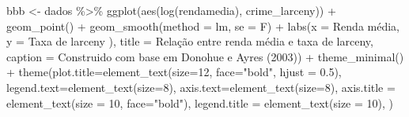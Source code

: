 \documentclass[
]{article}
\newenvironment{Shaded}{\begin{snugshade}}{\end{snugshade}}
\newcommand{\AttributeTok}[1]{\textcolor[rgb]{0.77,0.63,0.00}{#1}}
\newcommand{\DecValTok}[1]{\textcolor[rgb]{0.00,0.00,0.81}{#1}}
\newcommand{\FloatTok}[1]{\textcolor[rgb]{0.00,0.00,0.81}{#1}}
\newcommand{\FunctionTok}[1]{\textcolor[rgb]{0.00,0.00,0.00}{#1}}
\newcommand{\NormalTok}[1]{#1}
\newcommand{\OtherTok}[1]{\textcolor[rgb]{0.56,0.35,0.01}{#1}}
\newcommand{\SpecialCharTok}[1]{\textcolor[rgb]{0.00,0.00,0.00}{#1}}
\newcommand{\StringTok}[1]{\textcolor[rgb]{0.31,0.60,0.02}{#1}}
\begin{document}
\begin{Shaded}
\begin{Highlighting}[]
\NormalTok{bbb }\OtherTok{\textless{}{-}}\NormalTok{ dados }\SpecialCharTok{\%\textgreater{}\%} 
  \FunctionTok{ggplot}\NormalTok{(}\FunctionTok{aes}\NormalTok{(}\FunctionTok{log}\NormalTok{(rendamedia), crime\_larceny)) }\SpecialCharTok{+}
  \FunctionTok{geom\_point}\NormalTok{() }\SpecialCharTok{+} 
  \FunctionTok{geom\_smooth}\NormalTok{(}\AttributeTok{method =} \StringTok{\textquotesingle{}lm\textquotesingle{}}\NormalTok{, }\AttributeTok{se =}\NormalTok{ F) }\SpecialCharTok{+}
  \FunctionTok{labs}\NormalTok{(}\AttributeTok{x =} \StringTok{\textquotesingle{}Renda média\textquotesingle{}}\NormalTok{,}
       \AttributeTok{y =} \StringTok{\textquotesingle{}Taxa de larceny )\textquotesingle{}}\NormalTok{,}
       \AttributeTok{title =} \StringTok{\textquotesingle{}Relação entre renda média e taxa de larceny\textquotesingle{}}\NormalTok{,}
       \AttributeTok{caption =} \StringTok{\textquotesingle{}Construido com base em Donohue e Ayres (2003)\textquotesingle{}}\NormalTok{) }\SpecialCharTok{+} 
  \FunctionTok{theme\_minimal}\NormalTok{() }\SpecialCharTok{+}
  \FunctionTok{theme}\NormalTok{(}\AttributeTok{plot.title=}\FunctionTok{element\_text}\NormalTok{(}\AttributeTok{size=}\DecValTok{12}\NormalTok{, }\AttributeTok{face=}\StringTok{"bold"}\NormalTok{, }\AttributeTok{hjust =} \FloatTok{0.5}\NormalTok{),}
        \AttributeTok{legend.text=}\FunctionTok{element\_text}\NormalTok{(}\AttributeTok{size=}\DecValTok{8}\NormalTok{),}
        \AttributeTok{axis.text=}\FunctionTok{element\_text}\NormalTok{(}\AttributeTok{size=}\DecValTok{8}\NormalTok{),}
        \AttributeTok{axis.title =} \FunctionTok{element\_text}\NormalTok{(}\AttributeTok{size =} \DecValTok{10}\NormalTok{, }\AttributeTok{face=}\StringTok{"bold"}\NormalTok{),}
        \AttributeTok{legend.title =} \FunctionTok{element\_text}\NormalTok{(}\AttributeTok{size =} \DecValTok{10}\NormalTok{),}
\NormalTok{  )}



\end{Highlighting}
\end{Shaded}
\end{document}
